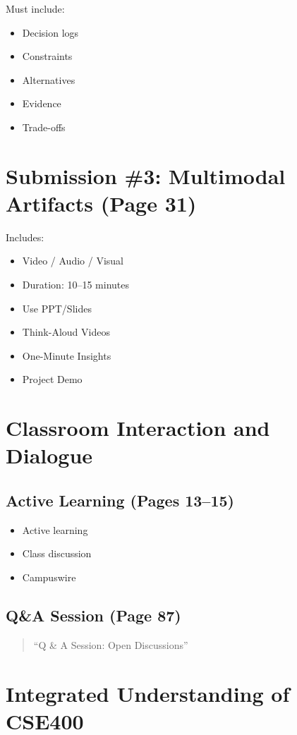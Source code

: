 \documentclass[12pt]{article}
\begin{document}
Must include:

\begin{itemize}
\item Decision logs
\item Constraints
\item Alternatives
\item Evidence
\item Trade-offs
\end{itemize}

\section{Submission \#3: Multimodal Artifacts (Page 31)}

Includes:

\begin{itemize}
\item Video / Audio / Visual
\item Duration: 10--15 minutes
\item Use PPT/Slides
\item Think-Aloud Videos
\item One-Minute Insights
\item Project Demo
\end{itemize}

\section{Classroom Interaction and Dialogue}

\subsection{Active Learning (Pages 13--15)}

\begin{itemize}
\item Active learning
\item Class discussion
\item Campuswire
\end{itemize}

\subsection{Q\&A Session (Page 87)}

\begin{quote}
``Q \& A Session: Open Discussions''
\end{quote}

\section{Integrated Understanding of CSE400}
\end{document}

